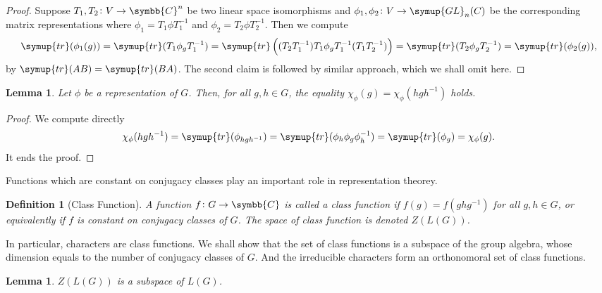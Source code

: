 \documentclass{assignment}[2019/10/15]
\theoremstyle{plain}
\newtheorem{definition}[theorem]{Definition}
\newtheorem{lemma}[theorem]{Lemma}
\newcommand{\BC}{\symbb{C}}
\newcommand{\GL}{\mathop{}\!\symup{GL}}
\newcommand{\tr}{\mathop{}\!\symup{tr}}
\numberwithin{equation}{section}
\begin{document}
    \begin{proof}
        Suppose $T_1, T_2\colon V\to \BC^n$ be two linear space isomorphisms and $\phi_1, \phi_2\colon V\to\GL_n(C)$ be the corresponding matrix representations where $\phi_1 = T_1\phi T_1^{-1}$ and $\phi_2 = T_2\phi T_2^{-1}$. Then we compute
        \begin{equation}
            \tr(\phi_1(g)) = \tr(T_1\phi_g T_1^{-1}) = \tr\left((T_2T_1^{-1})T_1\phi_g T_1^{-1}(T_1T_2^{-1})\right) = \tr(T_2\phi_g T_2^{-1}) = \tr(\phi_2(g)),
        \end{equation}
        by $\tr(AB)=\tr(BA)$. The second claim is followed by similar approach, which we shall omit here.
    \end{proof}

    \begin{lemma}
        Let $\phi$ be a representation of $G$. Then, for all $g, h\in G$, the equality $\chi_\phi(g)=\chi_\phi(hgh^{-1})$ holds.
    \end{lemma}

    \begin{proof}
        We compute directly
        \begin{equation}
            \chi_\phi(hgh^{-1}) = \tr(\phi_{hgh^{-1}}) = \tr(\phi_h\phi_g\phi_h^{-1}) = \tr(\phi_g) = \chi_\phi(g).
        \end{equation}
        It ends the proof.
    \end{proof}

    Functions which are constant on conjugacy classes play an important role in representation theorey.

    \begin{definition}[Class Function]
        A function $f\colon G\to \BC$ is called a \emph{class function} if $f(g)=f(ghg^{-1})$ for all $g, h\in G$, or equivalently if $f$ is constant on conjugacy classes of $G$. The space of class function is denoted $Z(L(G))$.
    \end{definition}

    In particular, characters are class functions. We shall show that the set of class functions is a subspace of the group algebra, whose dimension equals to the number of conjugacy classes of $G$. And the irreducible characters form an orthonomoral set of class functions.

    \begin{lemma}
        $Z(L(G))$ is a subspace of $L(G)$.
    \end{lemma}
\end{document}
